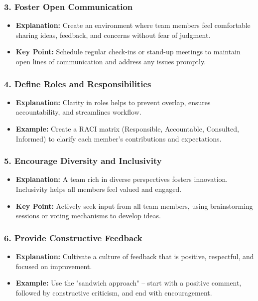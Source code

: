 \documentclass[aspectratio=169]{beamer}
\begin{document}
\begin{frame}[fragile]
    \frametitle{3. Foster Open Communication}
    \begin{itemize}
        \item \textbf{Explanation:} Create an environment where team members feel comfortable sharing ideas, feedback, and concerns without fear of judgment.
        \item \textbf{Key Point:} Schedule regular check-ins or stand-up meetings to maintain open lines of communication and address any issues promptly.
    \end{itemize}
\end{frame}

\begin{frame}[fragile]
    \frametitle{4. Define Roles and Responsibilities}
    \begin{itemize}
        \item \textbf{Explanation:} Clarity in roles helps to prevent overlap, ensures accountability, and streamlines workflow.
        \item \textbf{Example:} Create a RACI matrix (Responsible, Accountable, Consulted, Informed) to clarify each member's contributions and expectations.
    \end{itemize}
\end{frame}

\begin{frame}[fragile]
    \frametitle{5. Encourage Diversity and Inclusivity}
    \begin{itemize}
        \item \textbf{Explanation:} A team rich in diverse perspectives fosters innovation. Inclusivity helps all members feel valued and engaged.
        \item \textbf{Key Point:} Actively seek input from all team members, using brainstorming sessions or voting mechanisms to develop ideas.
    \end{itemize}
\end{frame}

\begin{frame}[fragile]
    \frametitle{6. Provide Constructive Feedback}
    \begin{itemize}
        \item \textbf{Explanation:} Cultivate a culture of feedback that is positive, respectful, and focused on improvement.
        \item \textbf{Example:} Use the "sandwich approach" – start with a positive comment, followed by constructive criticism, and end with encouragement.
    \end{itemize}
\end{frame}
\end{document}
